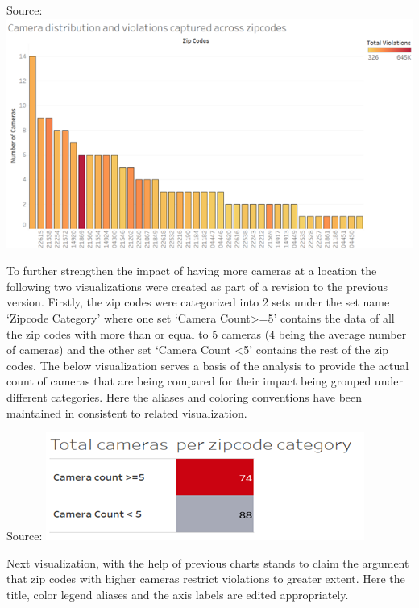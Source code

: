 \documentclass[]{book}
\begin{document}
Source:\citep{revised}
\includegraphics{images/Rev_img9.png}

To further strengthen the impact of having more cameras at a location the following two visualizations were created as part of a revision to the previous version. Firstly, the zip codes were categorized into 2 sets under the set name `Zipcode Category' where one set `Camera Count\textgreater{}=5' contains the data of all the zip codes with more than or equal to 5 cameras (4 being the average number of cameras) and the other set `Camera Count \textless{}5' contains the rest of the zip codes.
The below visualization serves a basis of the analysis to provide the actual count of cameras that are being compared for their impact being grouped under different categories. Here the aliases and coloring conventions have been maintained in consistent to related visualization.

Source: \citep{revised}
\includegraphics{images/Rev_img10.png}

Next visualization, with the help of previous charts stands to claim the argument that zip codes with higher cameras restrict violations to greater extent. Here the title, color legend aliases and the axis labels are edited appropriately.
\end{document}
